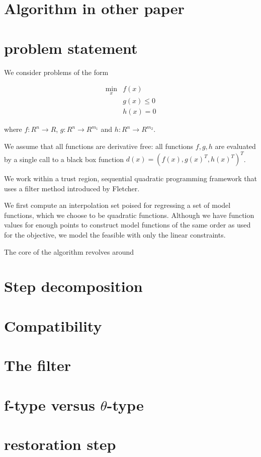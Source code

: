 \documentclass{article} %
\begin{document}
\section{Algorithm in other paper}


\section{problem statement}
We consider problems of the form

\begin{align*} 
\min_x & f(x) \\
 & g(x) \le 0 \\
 & h(x) = 0
\end{align*}

where $f : R^n \to R$, $g : R^{n} \to R^{m_1}$ and $h : R^{n} \to R^{m_2}$.


We assume that all functions are derivative free: all functions $f,g,h$ are evaluated by a single call to a black box function $d(x) = (f(x), g(x)^T, h(x)^T)^T$.


We work within a trust region, sequential quadratic programming framework that uses a filter method introduced by Fletcher.

We first compute an interpolation set poised for regressing a set of model functions, which we choose to be quadratic functions.
Although we have function values for enough points to construct model functions of the same order as used for the objective, we model the feasible with only the linear constraints.

The core of the algorithm revolves around 



\section{Step decomposition}
\section{Compatibility}
\section{The filter}
\section{f-type versus $\theta$-type}
\section{restoration step}
\end{document}
